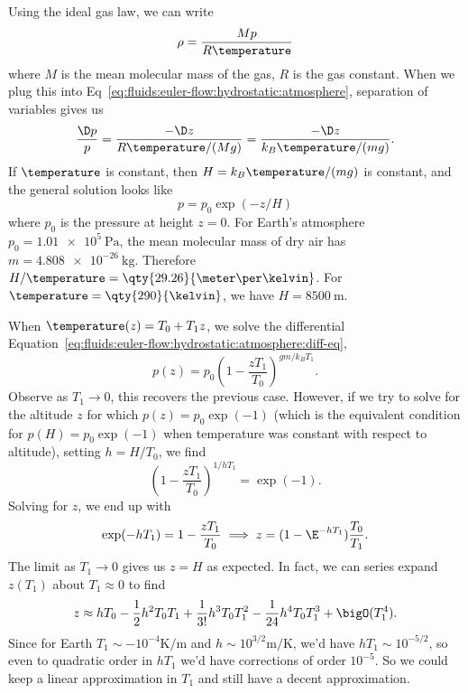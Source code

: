 \begin{node}[Hydrostatics]
\begin{node}[Atmosphere]
Using the ideal gas law, we can write
\begin{equation*}
\rho = \frac{Mp}{R\temperature}
\end{equation*}
where $M$ is the mean molecular mass of the gas, $R$ is the gas constant.
When we plug this into Eq~\eqref{eq:fluids:euler-flow:hydrostatic:atmosphere},
separation of variables gives us
\begin{equation}\label{eq:fluids:euler-flow:hydrostatic:atmosphere:diff-eq}
\frac{\D p}{p} = \frac{-\D z}{R\temperature/(Mg)}
               = \frac{-\D z}{k_{B}\temperature/(mg)}.
\end{equation}
If $\temperature$ is constant, then $H=k_{B}\temperature/(mg)$ is
constant, and the general solution looks like
\begin{equation}
p=p_{0}\exp(-z/H)
\end{equation}
where $p_{0}$ is the pressure at height $z=0$. For Earth's atmosphere
$p_{0}=\qty{1.01e5}{\pascal}$, the mean molecular mass of dry air has
$m=\qty{4.808e-26}{\kilo\gram}$. Therefore
$H/\temperature=\qty{29.26}{\meter\per\kelvin}$. 
For $\temperature=\qty{290}{\kelvin}$, we have $H=\qty{8500}{\meter}$.

\begin{node}\label{fluids:euler-flow-000B}%
When $\temperature(z)=T_{0}+T_{1}z$, we solve the differential Equation~\eqref{eq:fluids:euler-flow:hydrostatic:atmosphere:diff-eq},
\begin{equation}
p(z) = p_{0}\left(1 - \frac{z T_{1}}{T_{0}}\right)^{gm/k_{B}T_{1}}.
\end{equation}
Observe as $T_{1}\to0$, this recovers the previous case. However, if we
try to solve for the altitude $z$ for which $p(z)=p_{0}\exp(-1)$ (which
is the equivalent condition for $p(H)=p_{0}\exp(-1)$ when temperature
was constant with respect to altitude), setting $h=H/T_{0}$, we find
\begin{equation*}
\left(1 - \frac{z T_{1}}{T_{0}}\right)^{1/hT_{1}}=\exp(-1).
\end{equation*}
Solving for $z$, we end up with
\begin{equation*}
  \exp(-hT_{1})=1 - \frac{z T_{1}}{T_{0}}
  \implies
  z = (1-\E^{-hT_{1}})\frac{T_{0}}{T_{1}}.
\end{equation*}
The limit as $T_{1}\to 0$ gives us $z=H$ as expected. In fact, we can
series expand $z(T_{1})$ about $T_{1}\approx0$ to find
\begin{equation}
z\approx hT_{0}-\frac{1}{2}h^{2}T_{0}T_{1}+\frac{1}{3!}h^{3}T_{0}T_{1}^{2}-\frac{1}{24}h^{4}T_{0}T_{1}^{3}+\bigO(T_{1}^{4}).
\end{equation}
Since for Earth $T_{1}\sim-10^{-4}\unit{\kelvin\per\meter}$ and
$h\sim10^{3/2}\unit{\meter\per\kelvin}$, we'd have $hT_{1}\sim10^{-5/2}$,
so even to quadratic order in $hT_{1}$ we'd have corrections of order $10^{-5}$.
So we could keep a linear approximation in $T_{1}$ and still have a
decent approximation.


\end{node}
\end{node}
\end{node}
